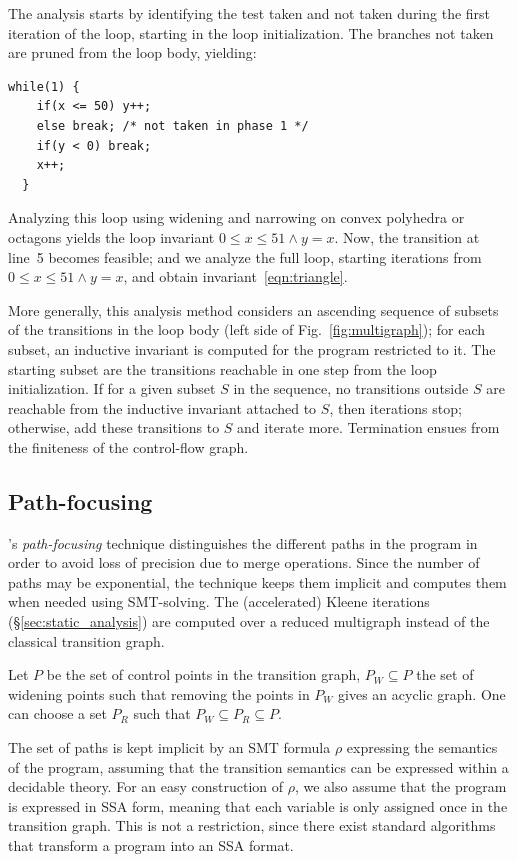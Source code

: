 \documentclass[preprint]{sigplanconf}
\begin{document}
The analysis starts by identifying the test taken and not taken during the first iteration of the loop, starting in the loop initialization. The branches not taken are pruned from the loop body, yielding:
\begin{lstlisting}[numbers=none]
  while(1) {
    if(x <= 50) y++;
    else break; /* not taken in phase 1 */
    if(y < 0) break;
    x++;
  }
\end{lstlisting}

Analyzing this loop using widening and narrowing on convex polyhedra or octagons yields the loop invariant $0 \leq x \leq 51 \land y = x$. Now, the transition at line~5 becomes feasible; and we analyze the full loop, starting iterations from $0 \leq x \leq 51 \land y = x$, and obtain invariant~\ref{eqn:triangle}.

More generally, this analysis method considers an ascending sequence of subsets of the transitions in the loop body (left side of Fig.~\ref{fig:multigraph});
for each subset, an inductive invariant is computed for the program restricted to it.
The starting subset are the transitions reachable in one step from the loop initialization.
If for a given subset $S$ in the sequence, no transitions outside $S$ are reachable from the inductive invariant attached to $S$, then iterations stop;
otherwise, add these transitions to $S$ and iterate more.
Termination ensues from the finiteness of the control-flow graph.


\subsection{Path-focusing}
\label{sec:path_focusing}

\citet{Monniaux_Gonnord_SAS11}'s \emph{path-focusing} technique
distinguishes the different paths in the program in order to avoid loss of
precision due to merge operations. Since the number of paths may be exponential,
the technique keeps them implicit and computes them when needed using
SMT-solving.
The (accelerated) Kleene iterations (\S\ref{sec:static_analysis}) are computed over a reduced multigraph instead of the classical transition graph.

Let $P$ be the set of control points in the transition graph, 
$P_W \subseteq P$ the set of widening points
such that removing the points in $P_W$ gives an acyclic graph.
One can choose a set $P_R$ such that $P_W \subseteq P_R \subseteq P$.

The set of paths is kept implicit by an SMT formula $\rho$ expressing
the semantics of the program, assuming that the transition semantics can be
expressed within a decidable theory. For an easy construction of $\rho$, 
we also assume that the program is expressed in SSA form, meaning that each
variable is only assigned once in the transition graph. This is not a
restriction, since there exist standard algorithms that transform a program into
an SSA format.
\end{document}
